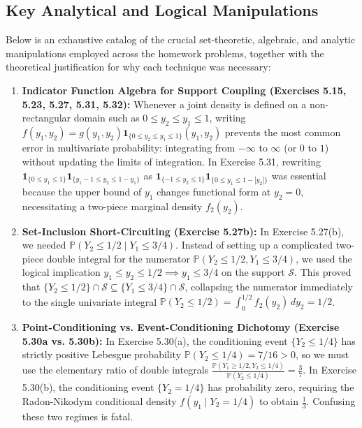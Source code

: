 \documentclass[11pt, letterpaper]{article}
\theoremstyle{definition}
\theoremstyle{remark}
\newcommand{\Prob}{\mathbb{P}}
\begin{document}
\subsection{Key Analytical and Logical Manipulations}

Below is an exhaustive catalog of the crucial set-theoretic, algebraic, and analytic manipulations employed across the homework problems, together with the theoretical justification for why each technique was necessary:

\begin{enumerate}
    \item \textbf{Indicator Function Algebra for Support Coupling (Exercises 5.15, 5.23, 5.27, 5.31, 5.32):}
    Whenever a joint density is defined on a non-rectangular domain such as $0 \le y_2 \le y_1 \le 1$, writing $f(y_1, y_2) = g(y_1, y_2) \mathbf{1}_{\{0 \le y_2 \le y_1 \le 1\}}(y_1, y_2)$ prevents the most common error in multivariate probability: integrating from $-\infty$ to $\infty$ (or $0$ to $1$) without updating the limits of integration. In Exercise 5.31, rewriting $\mathbf{1}_{\{0 \le y_1 \le 1\}} \mathbf{1}_{\{y_1 - 1 \le y_2 \le 1 - y_1\}}$ as $\mathbf{1}_{\{-1 \le y_2 \le 1\}} \mathbf{1}_{\{0 \le y_1 \le 1 - |y_2|\}}$ was essential because the upper bound of $y_1$ changes functional form at $y_2 = 0$, necessitating a two-piece marginal density $f_2(y_2)$.
    \item \textbf{Set-Inclusion Short-Circuiting (Exercise 5.27b):}
    In Exercise 5.27(b), we needed $\Prob(Y_2 \le 1/2 \mid Y_1 \le 3/4)$. Instead of setting up a complicated two-piece double integral for the numerator $\Prob(Y_2 \le 1/2, Y_1 \le 3/4)$, we used the logical implication $y_1 \le y_2 \le 1/2 \implies y_1 \le 3/4$ on the support $\mathcal{S}$. This proved that $\{Y_2 \le 1/2\} \cap \mathcal{S} \subseteq \{Y_1 \le 3/4\} \cap \mathcal{S}$, collapsing the numerator immediately to the single univariate integral $\Prob(Y_2 \le 1/2) = \int_0^{1/2} f_2(y_2) \, dy_2 = 1/2$.
    \item \textbf{Point-Conditioning vs. Event-Conditioning Dichotomy (Exercise 5.30a vs. 5.30b):}
    In Exercise 5.30(a), the conditioning event $\{Y_2 \le 1/4\}$ has strictly positive Lebesgue probability $\Prob(Y_2 \le 1/4) = 7/16 > 0$, so we must use the elementary ratio of double integrals $\frac{\Prob(Y_1 \ge 1/2, Y_2 \le 1/4)}{\Prob(Y_2 \le 1/4)} = \frac{3}{7}$. In Exercise 5.30(b), the conditioning event $\{Y_2 = 1/4\}$ has probability zero, requiring the Radon-Nikodym conditional density $f(y_1 \mid Y_2 = 1/4)$ to obtain $\frac{1}{3}$. Confusing these two regimes is fatal.

\end{enumerate}
\end{document}
